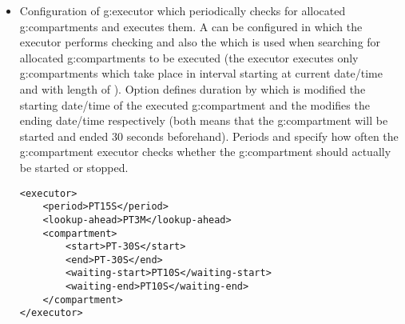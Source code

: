\begin{itemize}
\item Configuration of \gls{g:executor} which periodically checks for allocated \glspl{g:compartment} and executes them. A  can be configured in which the executor performs checking and also the  which is used when searching for allocated \glspl{g:compartment} to be executed (the executor executes only \glspl{g:compartment} which take place in interval starting at current date/time and with length of ). Option  defines duration by which is modified the starting date/time of the executed \gls{g:compartment} and the  modifies the ending date/time respectively (both  means that the \gls{g:compartment} will be started and ended 30 seconds beforehand). Periods  and  specify how often the \gls{g:compartment} executor checks whether the \gls{g:compartment} should actually be started or stopped.
\begin{verbatim}
<executor>
    <period>PT15S</period>
    <lookup-ahead>PT3M</lookup-ahead>
    <compartment>
        <start>PT-30S</start>
        <end>PT-30S</end>
        <waiting-start>PT10S</waiting-start>
        <waiting-end>PT10S</waiting-end>
    </compartment>
</executor>
\end{verbatim}
\end{itemize}

